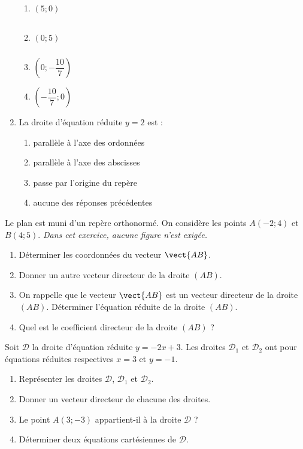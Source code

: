 \documentclass[a4paper]{article}
\begin{document}
\begin{enumerate}
\begin{multicols}{4}
    \begin{enumerate}
      \item $(5;0)\phantom{\left(\dfrac{10}{7}\right.}$
      \item $(0;5)\phantom{\left(\dfrac{10}{7}\right.}$
      \item $\left(0;-\dfrac{10}{7}\right)$
      \item $\left(-\dfrac{10}{7};0\right)$
    \end{enumerate}
  \end{multicols}
  \item La droite d'équation réduite $y=2$ est :
    \begin{multicols}{4}
      \begin{enumerate}
	\item parallèle à l'axe des ordonnées
	\item parallèle à l'axe des abscisses
	\item passe par l'origine du repère
	\item aucune des réponses précédentes
      \end{enumerate} 
    \end{multicols} 
\end{enumerate}

\smallskip

\exo[5 points] Le plan est muni d'un repère orthonormé. On considère les points $A(-2;4)$ et $B(4;5)$. \textit{Dans cet exercice, aucune figure n'est exigée.}
\begin{enumerate}
  \item Déterminer les coordonnées du vecteur $\vect{AB}$.
  \item Donner un autre vecteur directeur de la droite $(AB)$.
  \item On rappelle que le vecteur $\vect{AB}$ est un vecteur directeur de la droite $(AB)$. Déterminer l'équation réduite de la droite $(AB)$.
  \item Quel est le coefficient directeur de la droite $(AB)$ ?
\end{enumerate}

\smallskip

\exo[5 points] Soit $\mathcal{D}$ la droite d'équation réduite $y=-2x+3$. Les droites $\mathcal{D}_1$ et $\mathcal{D}_2$ ont pour équations réduites respectives $x=3$ et $y=-1$.
\begin{enumerate}
  \item Représenter les droites $\mathcal{D}$, $\mathcal{D}_1$ et $\mathcal{D}_2$.
  \item Donner un vecteur directeur de chacune des droites.
  \item Le point $A(3;-3)$ appartient-il à la droite $\mathcal{D}$ ?
  \item Déterminer deux équations cartésiennes de $\mathcal{D}$.
\end{enumerate}
\end{document}
